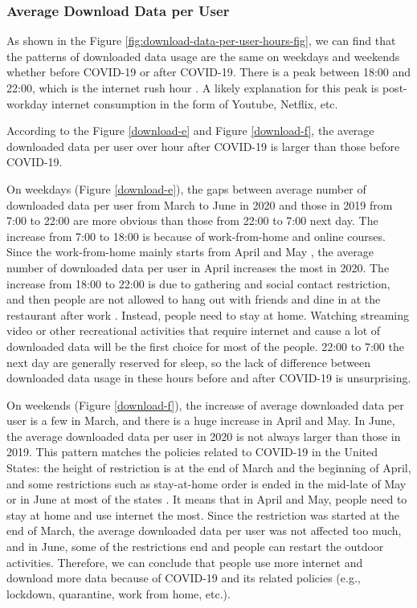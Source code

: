 \subsubsection{Average Download Data per User}
\label{sec:download-data-per-user-over-hours}


As shown in the Figure \ref{fig:download-data-per-user-hours-fig}, we can find that the patterns of downloaded data usage are the same on weekdays and weekends whether before COVID-19 or after COVID-19. There is a peak between 18:00 and 22:00, which is the internet rush hour \cite{internetrushhour}. A likely explanation for this peak is post-workday internet consumption in the form of Youtube, Netflix, etc. 

According to the Figure \ref{download-e} and Figure \ref{download-f}, the average downloaded data per user over hour after COVID-19 is larger than those before COVID-19. 

On weekdays (Figure \ref{download-e}), the gaps between average number of downloaded data per user from March to June in 2020 and those in 2019 from 7:00 to 22:00 are more obvious than those from 22:00 to 7:00 next day. The increase from 7:00 to 18:00 is because of work-from-home and online courses. Since the work-from-home mainly starts from April and May \cite{remotework}, the average number of downloaded data per user in April increases the most in 2020. The increase from 18:00 to 22:00 is due to gathering and social contact restriction, and then people are not allowed to hang out with friends and dine in at the restaurant after work \cite{lockdownsguide}. Instead, people need to stay at home. Watching streaming video or other recreational activities that require internet and cause a lot of downloaded data will be the first choice for most of the people. 22:00 to 7:00 the next day are generally reserved for sleep, so the lack of difference between downloaded data usage in these hours before and after COVID-19 is unsurprising. 

On weekends (Figure \ref{download-f}), the increase of average downloaded data per user is a few in March, and there is a huge increase in April and May. In June, the average downloaded data per user in 2020 is not always larger than those in 2019. This pattern matches the policies related to COVID-19 in the United States: the height of restriction is at the end of March and the beginning of April, and some restrictions such as stay-at-home order is ended in the mid-late of May or in June at most of the states \cite{covid19restriction}. It means that in April and May, people need to stay at home and use internet the most. Since the restriction was started at the end of March, the average downloaded data per user was not affected too much, and in June, some of the restrictions end and people can restart the outdoor activities. Therefore, we can conclude that people use more internet and download more data because of COVID-19 and its related policies (e.g., lockdown, quarantine, work from home, etc.). 

